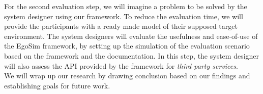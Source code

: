 For the second evaluation step, we will imagine a problem to be solved by the system designer using our framework. To reduce the evaluation time, we will provide the participants with a ready made model of their supposed target environment. The system designers will evaluate the usefulness and ease-of-use of the EgoSim framework, by setting up the simulation of the evaluation scenario based on the framework and the documentation. In this step, the system designer will also assess the API provided by the framework for \emph{third party services}.\\


We will wrap up our research by drawing conclusion based on our findings and establishing goals for future work.



